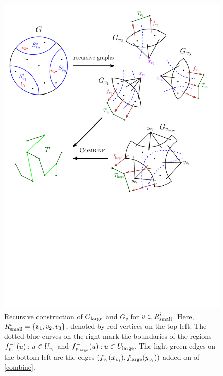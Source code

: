 \begin{figure}\centering
\includegraphics[scale=.8]{recursion.pdf}
\caption{Recursive construction of $G_{\textup{large}}$ and $G_v$ for $v\in R^i_{\textup{small}}$. Here, $R^i_{\textup{small}}=\{v_1,v_2,v_3\}$, denoted by red vertices on the top left. The dotted blue curves on the right mark the boundaries of the regions $f_{v_i}^{-1}(u):u\in U_{v_i}$ and $f_{v_{\textup{large}}}^{-1}(u):u\in U_{\textup{large}}$. The light green edges on the bottom left are the edges $(f_{v_i}(x_{v_i}),f_{\textup{large}}(y_{v_i}))$ added on  of \ref{combine}.}\label{fig:recursion}
\end{figure}


